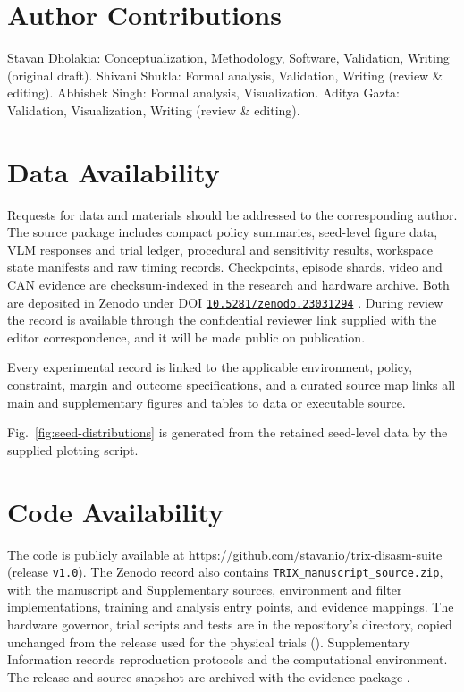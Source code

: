 \documentclass[12pt]{article}
\begin{document}
\section*{Author Contributions}
Stavan Dholakia: Conceptualization, Methodology, Software, Validation, Writing
(original draft). Shivani Shukla: Formal analysis, Validation, Writing
(review \& editing). Abhishek Singh: Formal analysis, Visualization.
Aditya Gazta: Validation, Visualization, Writing (review \& editing).

\section*{Data Availability}
Requests for data and materials should be addressed to the corresponding author. The source package includes compact policy summaries, seed-level figure
data, VLM responses and trial ledger, procedural and sensitivity results,
workspace state manifests and raw timing records. Checkpoints, episode shards,
video and CAN evidence are checksum-indexed in the research and hardware
archive. Both are deposited in Zenodo under DOI \href{https://doi.org/10.5281/zenodo.23031294}{\nolinkurl{10.5281/zenodo.23031294}} \cite{ref47}.
During review the record is available through the confidential reviewer link
supplied with the editor correspondence, and it will be made public on
publication.

Every experimental record is linked to the applicable environment, policy,
constraint, margin and outcome specifications, and a curated source map links
all main and supplementary figures and tables to data or executable source.

Fig.~\ref{fig:seed-distributions} is generated from the retained seed-level data by the supplied plotting script.

\section*{Code Availability}
The code is publicly available at
\url{https://github.com/stavanio/trix-disasm-suite} (release
\texttt{v1.0}). The Zenodo record also contains
\texttt{TRIX\_manuscript\_source.zip}, with the manuscript and Supplementary
sources, environment and filter implementations, training and analysis entry points, and evidence mappings. The hardware governor, trial scripts and
tests are in the repository's  directory, copied unchanged from
the release used for the physical trials
(). Supplementary Information
records reproduction protocols and the computational environment. The release and source snapshot are archived with the evidence package \cite{ref47}.
\end{document}
